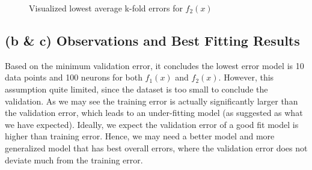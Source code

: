 \documentclass{tron}
\begin{document}
\begin{figure}[H]
	\centering
	\caption{Visualized lowest average k-fold errors for $f_2(x)$ \label{fig:p3:matrix-score:2}}
\end{figure}





\clearpage
\subsection{(b \& c) Observations and Best Fitting Results \label{sec:p2:observation}}
Based on the minimum validation error, it concludes the lowest error model is 10 data points and 100 neurons for both $f_1(x)$ and $f_2(x)$. However, this assumption quite limited, since the dataset is too small to conclude the validation. As we may see the training error is actually significantly larger than the validation error, which leads to an under-fitting model (as  suggested as what we have expected). Ideally, we expect the validation error of a good fit model is higher than training error. Hence, we may need a better model and more generalized model that has best overall errors, where the validation error does not deviate much from the training error. 
\end{document}
